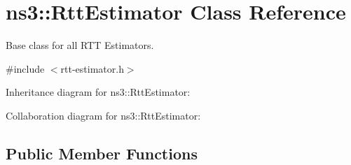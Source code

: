 \hypertarget{classns3_1_1RttEstimator}{}\section{ns3\+:\+:Rtt\+Estimator Class Reference}
\label{classns3_1_1RttEstimator}


Base class for all R\+TT Estimators.  




{\ttfamily \#include $<$rtt-\/estimator.\+h$>$}



Inheritance diagram for ns3\+:\+:Rtt\+Estimator\+:


Collaboration diagram for ns3\+:\+:Rtt\+Estimator\+:
\subsection*{Public Member Functions}
